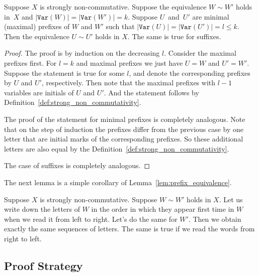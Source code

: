 \documentclass[a4paper,UKenglish,cleveref, autoref]{lipics-v2019}
\newcommand{\var}{\texttt{Var}}
\begin{document}
\begin{lemma} \label{lem:prefix_equivalence}
Suppose $X$ is strongly non-commutative. Suppose the equivalence $W \sim W'$
holds in~$X$ and $|\var(W)|=|\var(W')|=k$. Suppose $U$~and~$U'$ are minimal
(maximal) prefixes of $W$ and $W'$ such that $|\var(U)| = |\var(U')| = l\leq k$.
Then the equivalence $U \sim U'$ holds in $X$. The same is true for suffixes.
\end{lemma}

\begin{proof}
The proof is by induction on the decreasing $l$. Consider the maximal prefixes
first. For $l=k$ and maximal prefixes we just have $U=W$ and $U'=W'$. Suppose
the statement is true for some $l$, and denote the corresponding prefixes by $U$
and $U'$, respectively. Then note that the maximal prefixes with $l-1$ variables
are initials of $U$ and $U'$. And the statement follows by
Definition~\ref{def:strong_non_commutativity}.

The proof of the statement for minimal prefixes is completely analogous. Note
that on the step of induction the prefixes differ from the previous case by one
letter that are initial marks of the corresponding prefixes. So these additional
letters are also equal by the Definition~\ref{def:strong_non_commutativity}.

The case of suffixes is completely analogous.
\end{proof}

The next lemma is a simple corollary of Lemma~\ref{lem:prefix_equivalence}.
\begin{lemma} \label{lem:variables_order}
Suppose $X$ is strongly non-commutative. Suppose $W \sim W'$ holds in $X$. Let us write down the letters of $W$ in the order in which they appear first time in $W$ when we read it from left to right. Let's do the same for $W'$. Then we obtain exactly the same sequences of letters.
%
The same is true if we read the words from right to left.
\end{lemma}

\subsection{Proof Strategy}

\end{document}
